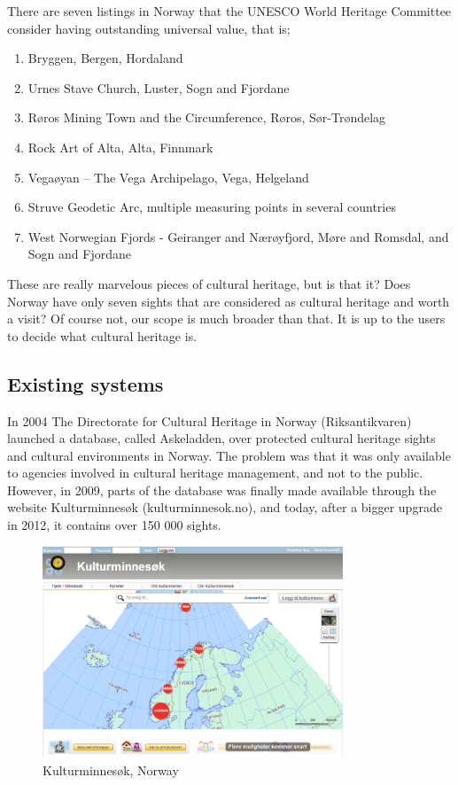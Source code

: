 \documentclass[11pt]{book}
\begin{document}
There are seven listings in Norway that the UNESCO World Heritage Committee consider having outstanding universal value, that is;

\begin{enumerate}
  \item Bryggen, Bergen, Hordaland
  \item Urnes Stave Church, Luster, Sogn and Fjordane
  \item Røros Mining Town and the Circumference, Røros, Sør-Trøndelag
  \item Rock Art of Alta, Alta, Finnmark
  \item Vegaøyan -- The Vega Archipelago, Vega, Helgeland
  \item Struve Geodetic Arc, multiple measuring points in several countries
  \item West Norwegian Fjords - Geiranger and Nærøyfjord, Møre and Romsdal, and Sogn and Fjordane
\end{enumerate}

These are really marvelous pieces of cultural heritage, but is that it? Does Norway have only seven sights that are considered as cultural heritage and worth a visit? Of course not, our scope is much broader than that. It is up to the users to decide what cultural heritage is.

\subsection{Existing systems}
In 2004 The Directorate for Cultural Heritage in Norway (Riksantikvaren) launched a database, called Askeladden, over protected cultural heritage sights and cultural environments in Norway. The problem was that it was only available to agencies involved in cultural heritage management, and not to the public. However,  in 2009, parts of the database was finally made available through the website Kulturminnesøk (kulturminnesok.no), and today, after a bigger upgrade in 2012, it contains over 150 000 sights.

\begin{figure}[H]
      \centering
      \includegraphics[width=0.8\textwidth]{Figures/Prestudy/kulturminnesokOversikt.png}
      \caption{Kulturminnesøk, Norway}
      \label{fig:pre_kulturoversikt}
\end{figure}
\end{document}

